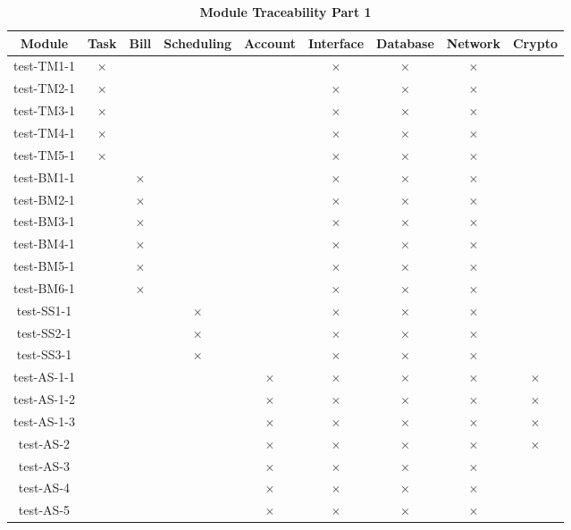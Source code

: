 \documentclass[12pt, titlepage]{article}
\begin{document}
\begin{table}[H]
\centering
\hspace*{-1cm}
\begin{tabular}{|c|c|c|c|c|c|c|c|c|}
\hline
Module & Task & Bill & Scheduling & Account & Interface & Database & Network & Crypto \\
\hline 
test-TM1-1 & $\times$ & & & & $\times$ & $\times$ & $\times$ &   \\
test-TM2-1 & $\times$ & & & & $\times$ & $\times$ & $\times$ &   \\
test-TM3-1 & $\times$ & & & & $\times$ & $\times$ & $\times$ &   \\
test-TM4-1 & $\times$ & & & & $\times$ & $\times$ & $\times$ &   \\
test-TM5-1 & $\times$ & & & & $\times$ & $\times$ & $\times$ &   \\
test-BM1-1& & $\times$ & & & $\times$ & $\times$ & $\times$ &   \\
test-BM2-1 & & $\times$ & & & $\times$ & $\times$ & $\times$ &   \\
test-BM3-1 & & $\times$ & & & $\times$ & $\times$ & $\times$ &   \\
test-BM4-1 & & $\times$ & & & $\times$ & $\times$ & $\times$ &   \\
test-BM5-1 & & $\times$ & & & $\times$ & $\times$ & $\times$ &   \\
test-BM6-1 & & $\times$ & & & $\times$ & $\times$ & $\times$ &   \\
test-SS1-1 & & & $\times$  & &  $\times$  &  $\times$  &  $\times$  &   \\
test-SS2-1 & & & $\times$  & &  $\times$  &  $\times$  &  $\times$  &   \\
test-SS3-1 & & & $\times$  & &  $\times$  &  $\times$  &  $\times$  &   \\
test-AS-1-1  & & & & $\times$ & $\times$ & $\times$ &  $\times$ & $\times$   \\
test-AS-1-2 & & & & $\times$ & $\times$ & $\times$ &  $\times$ & $\times$   \\
test-AS-1-3 & & & & $\times$ & $\times$ & $\times$ &  $\times$ & $\times$   \\
test-AS-2 & & & & $\times$ & $\times$ & $\times$ &  $\times$ & $\times$   \\
test-AS-3 & & & & $\times$ & $\times$ & $\times$ & $\times$ &   \\
test-AS-4 & & & & $\times$ & $\times$ & $\times$ & $\times$ &   \\
test-AS-5& & & & $\times$ & $\times$ & $\times$ & $\times$ &   \\
\hline
\end{tabular}
\caption{\bf Module Traceability Part 1}
\end{table}
\end{document}
